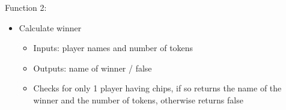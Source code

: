 \documentclass{article}
\begin{document}
Function 2:
\begin{itemize}
	\item Calculate winner
	\begin{itemize}
		\item Inputs: player names and number of tokens
		\item Outputs: name of winner / false
		\item Checks for only 1 player having chips, if so returns the name of the winner and the number of tokens, otherwise returns false
	\end{itemize}
\end{itemize}
\end{document}
